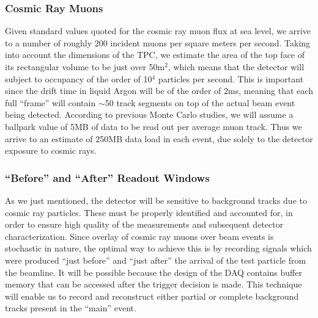 
\subsubsection{Cosmic Ray Muons}
Given standard values quoted for the cosmic ray muon flux at sea level, we arrive to a number of roughly 200 incident muons
per square meters per second.
Taking into account the dimensions of the TPC, we estimate the area of the top face of its rectangular volume to be just over 50m$^{2}$,
which means that the detector will subject to occupancy of the order of 10$^{4}$ particles per second. This is important since the drift time
in liquid Argon will be of the order of 2ms, meaning that each full ``frame'' will contain $\sim$50 track segments on top of the actual beam event
being detected. According to previous Monte Carlo studies, we will assume a ballpark value of 5MB of data to be read out per average muon track.
Thus we arrive to an estimate of 250MB data load in each event, due solely to the detector exposure to cosmic rays.

\subsubsection{``Before'' and ``After'' Readout Windows}
\label{readout_windows}


As we just mentioned, the detector will be sensitive to background tracks due to cosmic ray particles.  These must be properly identified
and accounted for, in order to ensure high quality of the measurements and subsequent detector characterization. Since overlay of cosmic
ray muons over beam events is stochastic in nature, the optimal way to achieve this is by recording signals which were produced ``just before''
and ``just after'' the arrival of the test particle from the beamline. It will be possible because the design of the DAQ contains buffer memory that
can be accessed after the trigger decision is made. This technique will enable us to record and reconstruct either partial or complete background
tracks present in the ``main'' event.

